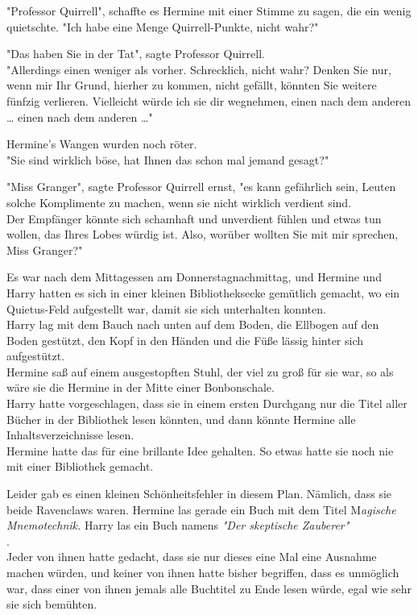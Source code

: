 {"Professor Quirrell", schaffte es Hermine mit einer Stimme zu sagen, die ein wenig quietschte. "Ich habe eine Menge Quirrell-Punkte, nicht wahr?"

"Das haben Sie in der Tat", sagte Professor Quirrell.\\ "Allerdings einen weniger als vorher. Schrecklich, nicht wahr? Denken Sie nur, wenn mir Ihr Grund, hierher zu kommen, nicht gefällt, könnten Sie weitere fünfzig verlieren. Vielleicht würde ich sie dir wegnehmen, einen nach dem anderen … einen nach dem anderen …"

Hermine's Wangen wurden noch röter.\\ "Sie sind wirklich böse, hat Ihnen das schon mal jemand gesagt?"

"Miss Granger", sagte Professor Quirrell ernst, "es kann gefährlich sein, Leuten solche Komplimente zu machen, wenn sie nicht wirklich verdient sind.\\ Der Empfänger könnte sich schamhaft und unverdient fühlen und etwas tun wollen, das Ihres Lobes würdig ist. Also, worüber wollten Sie mit mir sprechen, Miss Granger?"

Es war nach dem Mittagessen am Donnerstagnachmittag, und Hermine und Harry hatten es sich in einer kleinen Bibliotheksecke gemütlich gemacht, wo ein Quietus-Feld aufgestellt war, damit sie sich unterhalten konnten.\\ Harry lag mit dem Bauch nach unten auf dem Boden, die Ellbogen auf den Boden gestützt, den Kopf in den Händen und die Füße lässig hinter sich aufgestützt.\\ Hermine saß auf einem ausgestopften Stuhl, der viel zu groß für sie war, so als wäre sie die Hermine in der Mitte einer Bonbonschale.\\ Harry hatte vorgeschlagen, dass sie in einem ersten Durchgang nur die Titel aller Bücher in der Bibliothek lesen könnten, und dann könnte Hermine alle Inhaltsverzeichnisse lesen.\\ Hermine hatte das für eine brillante Idee gehalten. So etwas hatte sie noch nie mit einer Bibliothek gemacht.

Leider gab es einen kleinen Schönheitsfehler in diesem Plan. Nämlich, dass sie beide Ravenclaws waren. Hermine las gerade ein Buch mit dem Titel M\emph{agische Mnemotechnik.} Harry las ein Buch namens \emph{"Der skeptische Zauberer"}\\ .\\ Jeder von ihnen hatte gedacht, dass sie nur dieses eine Mal eine Ausnahme machen würden, und keiner von ihnen hatte bisher begriffen, dass es unmöglich war, dass einer von ihnen jemals alle Buchtitel zu Ende lesen würde, egal wie sehr sie sich bemühten.

}
